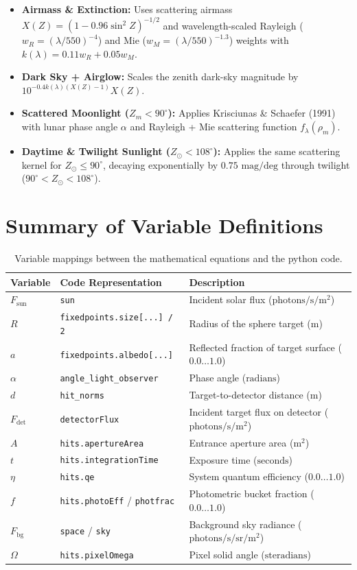 \documentclass[11pt,a4paper]{article}
\begin{document}
\begin{itemize}
    \item \textbf{Airmass \& Extinction:} Uses scattering airmass
    $X(Z) = (1 - 0.96 \sin^2 Z)^{-1/2}$ and wavelength-scaled Rayleigh ($w_R = (\lambda/550)^{-4}$)
    and Mie ($w_M = (\lambda/550)^{-1.3}$) weights with $k(\lambda) = 0.11 w_R + 0.05 w_M$.
    \item \textbf{Dark Sky + Airglow:} Scales the zenith dark-sky magnitude by
    $10^{-0.4 k(\lambda)(X(Z)-1)} X(Z)$.
    \item \textbf{Scattered Moonlight ($Z_m < 90^\circ$):} Applies Krisciunas \& Schaefer (1991)
    with lunar phase angle $\alpha$ and Rayleigh + Mie scattering function $f_\lambda(\rho_m)$.
    \item \textbf{Daytime \& Twilight Sunlight ($Z_\odot < 108^\circ$):} Applies the same scattering
    kernel for $Z_\odot \le 90^\circ$, decaying exponentially by $0.75\text{ mag/deg}$ through
    twilight ($90^\circ < Z_\odot < 108^\circ$).
\end{itemize}

\section{Summary of Variable Definitions}
\begin{table}[h]
\centering
\begin{tabular}{lll}
\toprule
Variable & Code Representation & Description \\
\midrule
$F_{\text{sun}}$ & \texttt{sun} & Incident solar flux ($\text{photons}/\text{s}/\text{m}^2$) \\
$R$ & \texttt{fixedpoints.size[...] / 2} & Radius of the sphere target ($\text{m}$) \\
$a$ & \texttt{fixedpoints.albedo[...]} & Reflected fraction of target surface ($0.0 \dots 1.0$) \\
$\alpha$ & \texttt{angle\_light\_observer} & Phase angle ($\text{radians}$) \\
$d$ & \texttt{hit\_norms} & Target-to-detector distance ($\text{m}$) \\
$F_{\text{det}}$ & \texttt{detectorFlux} & Incident target flux on detector ($\text{photons}/\text{s}/\text{m}^2$) \\
$A$ & \texttt{hits.apertureArea} & Entrance aperture area ($\text{m}^2$) \\
$t$ & \texttt{hits.integrationTime} & Exposure time ($\text{seconds}$) \\
$\eta$ & \texttt{hits.qe} & System quantum efficiency ($0.0 \dots 1.0$) \\
$f$ & \texttt{hits.photoEff} / \texttt{photfrac} & Photometric bucket fraction ($0.0 \dots 1.0$) \\
$F_{\text{bg}}$ & \texttt{space} / \texttt{sky} & Background sky radiance ($\text{photons}/\text{s}/\text{sr}/\text{m}^2$) \\
$\Omega$ & \texttt{hits.pixelOmega} & Pixel solid angle ($\text{steradians}$) \\
\bottomrule
\end{tabular}
\caption{Variable mappings between the mathematical equations and the python code.}
\end{table}
\end{document}
